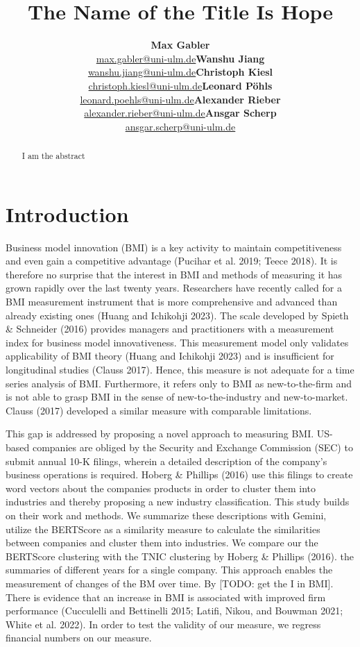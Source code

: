\documentclass[
]{article}
\title{The Name of the Title Is Hope}
\author{\textbf{Max
Gabler}\\\href{mailto:max.gabler@uni-ulm.de}{max.gabler@uni-ulm.de}\asep\textbf{Wanshu
Jiang}\\\href{mailto:wanshu.jiang@uni-ulm.de}{wanshu.jiang@uni-ulm.de}\asep\textbf{Christoph
Kiesl}\\\href{mailto:christoph.kiesl@uni-ulm.de}{christoph.kiesl@uni-ulm.de}\asep\textbf{Leonard
Pöhls}\\\href{mailto:leonard.poehls@uni-ulm.de}{leonard.poehls@uni-ulm.de}\asep\textbf{Alexander
Rieber}\\\href{mailto:alexander.rieber@uni-ulm.de}{alexander.rieber@uni-ulm.de}\asep\textbf{Ansgar
Scherp}\\\href{mailto:ansgar.scherp@uni-ulm.de}{ansgar.scherp@uni-ulm.de}}
\date{}
\renewcommand*\contentsname{Table of contents}
\newcommand\contentsname{Table of contents}
\begin{document}
\maketitle
\begin{abstract}
I am the abstract
\end{abstract}

\renewcommand*\contentsname{Table of contents}
{
\hypersetup{linkcolor=}
\setcounter{tocdepth}{3}
\tableofcontents
}
\section{Introduction}\label{introduction}

Business model innovation (BMI) is a key activity to maintain
competitiveness and even gain a competitive advantage (Pucihar et al.
2019; Teece 2018). It is therefore no surprise that the interest in BMI
and methods of measuring it has grown rapidly over the last twenty
years. Researchers have recently called for a BMI measurement instrument
that is more comprehensive and advanced than already existing ones
(Huang and Ichikohji 2023). The scale developed by Spieth \& Schneider
(2016) provides managers and practitioners with a measurement index for
business model innovativeness. This measurement model only validates
applicability of BMI theory (Huang and Ichikohji 2023) and is
insufficient for longitudinal studies (Clauss 2017). Hence, this measure
is not adequate for a time series analysis of BMI. Furthermore, it
refers only to BMI as new-to-the-firm and is not able to grasp BMI in
the sense of new-to-the-industry and new-to-market. Clauss (2017)
developed a similar measure with comparable limitations.

This gap is addressed by proposing a novel approach to measuring BMI.
US-based companies are obliged by the Security and Exchange Commission
(SEC) to submit annual 10-K filings, wherein a detailed description of
the company's business operations is required. Hoberg \& Phillips (2016)
use this filings to create word vectors about the companies products in
order to cluster them into industries and thereby proposing a new
industry classification. This study builds on their work and methods. We
summarize these descriptions with Gemini, utilize the BERTScore as a
similarity measure to calculate the similarities between companies and
cluster them into industries. We compare our the BERTScore clustering
with the TNIC clustering by Hoberg \& Phillips (2016). the summaries of
different years for a single company. This approach enables the
measurement of changes of the BM over time. By {[}TODO: get the I in
BMI{]}. There is evidence that an increase in BMI is associated with
improved firm performance (Cucculelli and Bettinelli 2015; Latifi,
Nikou, and Bouwman 2021; White et al. 2022). In order to test the
validity of our measure, we regress financial numbers on our measure.
\end{document}
